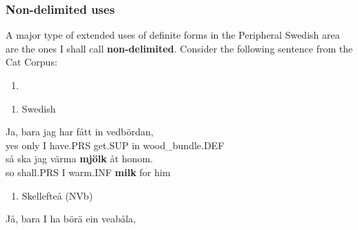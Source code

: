 \subsubsection[Non{}-delimited uses]{\rmfamily Non-delimited uses}
\label{bkm:Ref105226557}%
A major type of extended uses of definite forms in the Peripheral Swedish area are the ones I shall call \textbf{non-delimited}. Consider the following sentence from the Cat Corpus: 

\begin{enumerate} %
\item 
\end{enumerate} %
\setcounter{listLFOxcviiileveli}{0}
\begin{enumerate} %
\item 
Swedish

\end{enumerate} %
\ea\label{}
\gll Ja,  bara  jag  har  fått  in  vedbördan,\\


yes  only  I  have.PRS  get.SUP  in  wood\_bundle.DEF\\ %


\ea\label{}
\gll så  ska  jag  värma  \textbf{mjölk} åt  honom.\\


so  shall.PRS  I  warm.INF  \textbf{milk} for  him\\ %


\begin{enumerate} %
\item 
\label{bkm:Ref110672187}Skellefteå (NVb)

\end{enumerate} %
\ea\label{}
\gll Jå,  bara  I  ha  börä  ein  veabåla,\\


